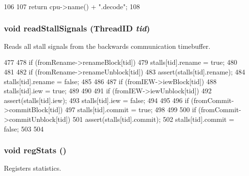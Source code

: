 \begin{DoxyCode}
106 {
107     return cpu->name() + ".decode";
108 }
\end{DoxyCode}
\hypertarget{classDefaultDecode_ad65c9f053a6038ac8c34c34bfe9a88c3}{
\subsubsection[{readStallSignals}]{\setlength{\rightskip}{0pt plus 5cm}void readStallSignals ({\bf ThreadID} {\em tid})}}
\label{classDefaultDecode_ad65c9f053a6038ac8c34c34bfe9a88c3}
Reads all stall signals from the backwards communication timebuffer. 


\begin{DoxyCode}
477 {
478     if (fromRename->renameBlock[tid]) {
479         stalls[tid].rename = true;
480     }
481 
482     if (fromRename->renameUnblock[tid]) {
483         assert(stalls[tid].rename);
484         stalls[tid].rename = false;
485     }
486 
487     if (fromIEW->iewBlock[tid]) {
488         stalls[tid].iew = true;
489     }
490 
491     if (fromIEW->iewUnblock[tid]) {
492         assert(stalls[tid].iew);
493         stalls[tid].iew = false;
494     }
495 
496     if (fromCommit->commitBlock[tid]) {
497         stalls[tid].commit = true;
498     }
499 
500     if (fromCommit->commitUnblock[tid]) {
501         assert(stalls[tid].commit);
502         stalls[tid].commit = false;
503     }
504 }
\end{DoxyCode}
\hypertarget{classDefaultDecode_a4dc637449366fcdfc4e764cdf12d9b11}{
\subsubsection[{regStats}]{\setlength{\rightskip}{0pt plus 5cm}void regStats ()}}
\label{classDefaultDecode_a4dc637449366fcdfc4e764cdf12d9b11}
Registers statistics. 


